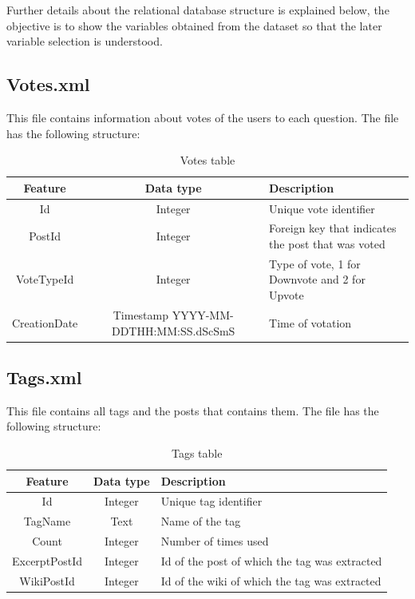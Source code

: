 \documentclass[11pt]{book} %
\begin{document}
    Further details about the relational database structure is explained below, the objective is to show the variables obtained from the dataset so that the later variable selection is understood.

    \subsection{Votes.xml}

      This file contains information about votes of the users to each question. The file has the following structure:

      \begin{table}[!ht]
        \centering
        \begin{tabular}{|c|c|p{}|}
          \hline
          Feature & Data type & Description \\ \hline
          Id & Integer & Unique vote identifier \\ \hline
          PostId & Integer & Foreign key that indicates the post that was voted \\ \hline
          VoteTypeId & Integer & Type of vote, 1 for Downvote and 2 for Upvote \\ \hline
          CreationDate & Timestamp YYYY-MM-DDTHH:MM:SS.dScSmS & Time of votation \\ \hline
        \end{tabular}
        \caption{Votes table}
        \label{tab:votes}
      \end{table}

\newpage

    \subsection{Tags.xml}

      This file contains all tags and the posts that contains them. The file has the following structure:

      \begin{table}[!ht]
        \centering
        \begin{tabular}{|c|c|p{}|}
          \hline

          Feature & Data type & Description \\ \hline
          Id & Integer & Unique tag identifier \\ \hline
          TagName & Text & Name of the tag \\ \hline
          Count & Integer & Number of times used \\ \hline
          ExcerptPostId & Integer & Id of the post of which the tag was extracted\\ \hline
          WikiPostId & Integer & Id of the wiki of which the tag was extracted\\

          \hline
        \end{tabular}
        \caption{Tags table}
        \label{tab:tags}
      \end{table}
\end{document}
